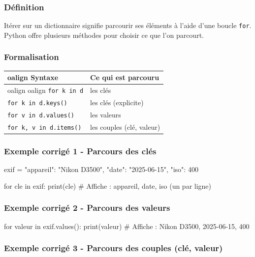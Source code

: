 \subsubsection{Définition}

Itérer sur un dictionnaire signifie parcourir ses éléments à l'aide
d'une boucle \texttt{for}. Python offre plusieurs méthodes pour choisir
ce que l'on parcourt.

\subsubsection{Formalisation}

\begin{longtable}[]{@{}ll@{}}
\toprule
oalign{}
Syntaxe & Ce qui est parcouru \\
\midrule
oalign{}
\endhead
\bottomrule
oalign{}
\endlastfoot
\texttt{for\ k\ in\ d} & les clés \\
\texttt{for\ k\ in\ d.keys()} & les clés (explicite) \\
\texttt{for\ v\ in\ d.values()} & les valeurs \\
\texttt{for\ k,\ v\ in\ d.items()} & les couples (clé, valeur) \\
\end{longtable}

\subsubsection{Exemple corrigé 1 - Parcours des clés}

\begin{python}
exif = {"appareil": "Nikon D3500", "date": "2025-06-15", "iso": 400}

for cle in exif:
    print(cle)
# Affiche : appareil, date, iso (un par ligne)
\end{python}

\subsubsection{Exemple corrigé 2 - Parcours des valeurs}

\begin{python}
for valeur in exif.values():
    print(valeur)
# Affiche : Nikon D3500, 2025-06-15, 400
\end{python}

\subsubsection{Exemple corrigé 3 - Parcours des couples (clé, valeur)}

